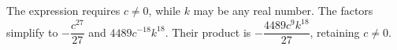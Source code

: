 The expression requires $c\ne0$, while $k$ may be any real number. The factors simplify to $-\dfrac{c^{27}}{27}$ and $4489c^{-18}k^{18}$. Their product is $\boxed{-\dfrac{4489c^9k^{18}}{27}}$, retaining $c\ne0$.
